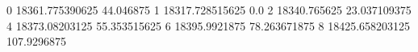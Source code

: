 0 18361.775390625 44.046875
1 18317.728515625 0.0
2 18340.765625 23.037109375
4 18373.08203125 55.353515625
6 18395.9921875 78.263671875
8 18425.658203125 107.9296875

